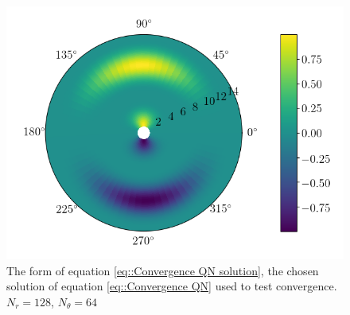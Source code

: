 \begin{figure}[b!]
 \centering
 \includegraphics[width=.7\textwidth]{Figs/PoissonConvergence/ExactSolution.png}
 \caption{\label{fig::Convergence QN shape} The form of equation \ref{eq::Convergence QN solution}, the chosen solution of equation \ref{eq::Convergence QN} used to test convergence. $N_r=128$, $N_\theta=64$}
\end{figure}

